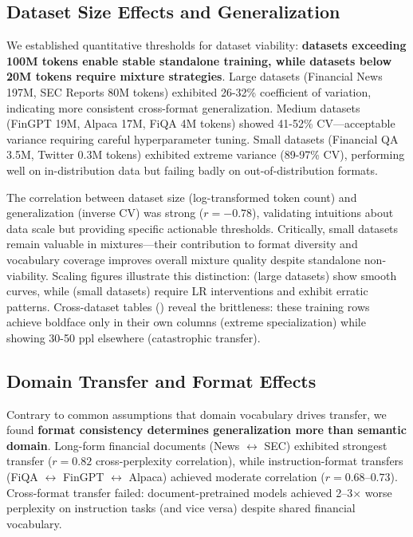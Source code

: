 \subsection{Dataset Size Effects and Generalization}

We established quantitative thresholds for dataset viability: \textbf{datasets exceeding 100M tokens enable stable standalone training, while datasets below 20M tokens require mixture strategies}. Large datasets (Financial News 197M, SEC Reports 80M tokens) exhibited 26-32\% coefficient of variation, indicating more consistent cross-format generalization. Medium datasets (FinGPT 19M, Alpaca 17M, FiQA 4M tokens) showed 41-52\% CV—acceptable variance requiring careful hyperparameter tuning. Small datasets (Financial QA 3.5M, Twitter 0.3M tokens) exhibited extreme variance (89-97\% CV), performing well on in-distribution data but failing badly on out-of-distribution formats.

The correlation between dataset size (log-transformed token count) and generalization (inverse CV) was strong ($r = -0.78$), validating intuitions about data scale but providing specific actionable thresholds. Critically, small datasets remain valuable in mixtures—their contribution to format diversity and vocabulary coverage improves overall mixture quality despite standalone non-viability. Scaling figures illustrate this distinction:  (large datasets) show smooth curves, while  (small datasets) require LR interventions and exhibit erratic patterns. Cross-dataset tables () reveal the brittleness: these training rows achieve boldface only in their own columns (extreme specialization) while showing 30-50 ppl elsewhere (catastrophic transfer).

\subsection{Domain Transfer and Format Effects}

Contrary to common assumptions that domain vocabulary drives transfer, we found \textbf{format consistency determines generalization more than semantic domain}. Long-form financial documents (News $\leftrightarrow$ SEC) exhibited strongest transfer ($r = 0.82$ cross-perplexity correlation), while instruction-format transfers (FiQA $\leftrightarrow$ FinGPT $\leftrightarrow$ Alpaca) achieved moderate correlation ($r = 0.68$--$0.73$). Cross-format transfer failed: document-pretrained models achieved 2--3$\times$ worse perplexity on instruction tasks (and vice versa) despite shared financial vocabulary.

